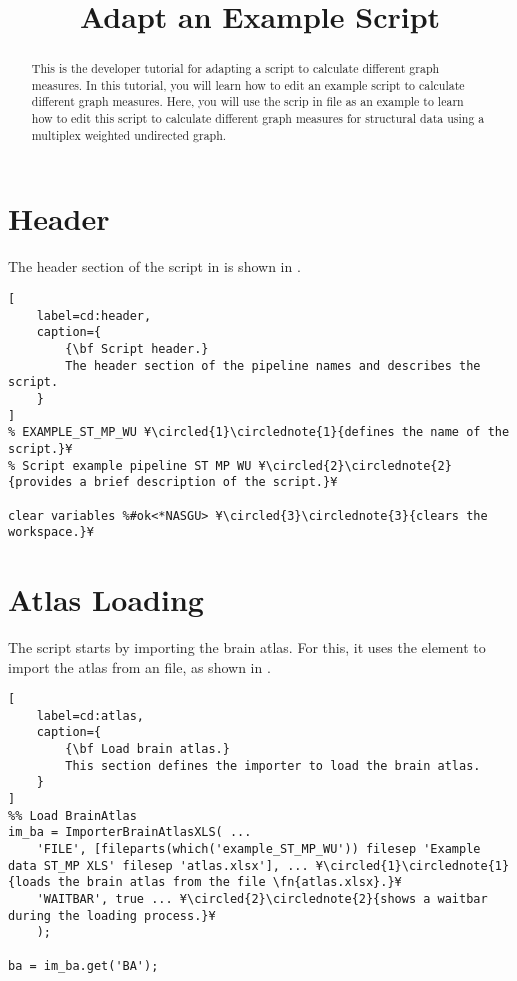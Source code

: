 \documentclass{tufte-handout}
\title{Adapt an Example Script}
\begin{document}
\maketitle

\begin{abstract}
\noindent
This is the developer tutorial for adapting a script to calculate different graph measures. In this tutorial, you will learn how to edit an example script to calculate different graph measures. Here, you will use the scrip in file  as an example to learn how to edit this script to calculate different graph measures for structural data using a multiplex weighted undirected graph.
\end{abstract}

\tableofcontents

\clearpage

\section{Header}

The header section of the script in  is shown in .

\begin{lstlisting}[
	label=cd:header,
	caption={
		{\bf Script header.}
		The header section of the pipeline names and describes the script.
	}
]
% EXAMPLE_ST_MP_WU ¥\circled{1}\circlednote{1}{defines the name of the script.}¥
% Script example pipeline ST MP WU ¥\circled{2}\circlednote{2}{provides a brief description of the script.}¥

clear variables %#ok<*NASGU> ¥\circled{3}\circlednote{3}{clears the workspace.}¥
\end{lstlisting}

\section{Atlas Loading}

The script starts by importing the brain atlas. For this, it uses the element  to import the atlas from an  file, as shown in .
 
\begin{lstlisting}[
	label=cd:atlas,
	caption={
		{\bf Load brain atlas.}
		This section defines the importer to load the brain atlas.
	}
]
%% Load BrainAtlas
im_ba = ImporterBrainAtlasXLS( ...
    'FILE', [fileparts(which('example_ST_MP_WU')) filesep 'Example data ST_MP XLS' filesep 'atlas.xlsx'], ... ¥\circled{1}\circlednote{1}{loads the brain atlas from the file \fn{atlas.xlsx}.}¥
    'WAITBAR', true ... ¥\circled{2}\circlednote{2}{shows a waitbar during the loading process.}¥
    );

ba = im_ba.get('BA');
\end{lstlisting}
\end{document}
